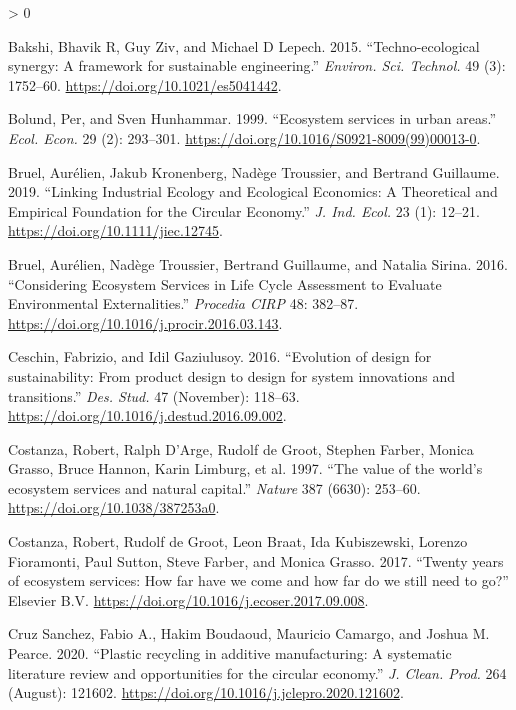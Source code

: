 \documentclass[
  14pt,
]{extarticle}
\newlength{\cslhangindent}
\newenvironment{CSLReferences}[2] %
 {%
  \setlength{\parindent}{0pt}
  \ifodd #1 \everypar{\setlength{\hangindent}{\cslhangindent}}\ignorespaces\fi
  \ifnum #2 > 0
  \setlength{\parskip}{#2\baselineskip}
  \fi
 }%
 {}
\begin{document}
\hypertarget{refs}{}
\begin{CSLReferences}{1}{0}
\leavevmode\hypertarget{ref-Bakshi2015}{}%
Bakshi, Bhavik R, Guy Ziv, and Michael D Lepech. 2015. {``{Techno-ecological synergy: A framework for sustainable engineering}.''} \emph{Environ. Sci. Technol.} 49 (3): 1752--60. \url{https://doi.org/10.1021/es5041442}.

\leavevmode\hypertarget{ref-Bolund1999}{}%
Bolund, Per, and Sven Hunhammar. 1999. {``{Ecosystem services in urban areas}.''} \emph{Ecol. Econ.} 29 (2): 293--301. \url{https://doi.org/10.1016/S0921-8009(99)00013-0}.

\leavevmode\hypertarget{ref-Bruel2018}{}%
Bruel, Aurélien, Jakub Kronenberg, Nadège Troussier, and Bertrand Guillaume. 2019. {``{Linking Industrial Ecology and Ecological Economics: A Theoretical and Empirical Foundation for the Circular Economy}.''} \emph{J. Ind. Ecol.} 23 (1): 12--21. \url{https://doi.org/10.1111/jiec.12745}.

\leavevmode\hypertarget{ref-Bruel2016}{}%
Bruel, Aurélien, Nadège Troussier, Bertrand Guillaume, and Natalia Sirina. 2016. {``{Considering Ecosystem Services in Life Cycle Assessment to Evaluate Environmental Externalities}.''} \emph{Procedia CIRP} 48: 382--87. \url{https://doi.org/10.1016/j.procir.2016.03.143}.

\leavevmode\hypertarget{ref-Ceschin2016}{}%
Ceschin, Fabrizio, and Idil Gaziulusoy. 2016. {``{Evolution of design for sustainability: From product design to design for system innovations and transitions}.''} \emph{Des. Stud.} 47 (November): 118--63. \url{https://doi.org/10.1016/j.destud.2016.09.002}.

\leavevmode\hypertarget{ref-Costanza1997}{}%
Costanza, Robert, Ralph D'Arge, Rudolf de Groot, Stephen Farber, Monica Grasso, Bruce Hannon, Karin Limburg, et al. 1997. {``{The value of the world's ecosystem services and natural capital}.''} \emph{Nature} 387 (6630): 253--60. \url{https://doi.org/10.1038/387253a0}.

\leavevmode\hypertarget{ref-Costanza2017}{}%
Costanza, Robert, Rudolf de Groot, Leon Braat, Ida Kubiszewski, Lorenzo Fioramonti, Paul Sutton, Steve Farber, and Monica Grasso. 2017. {``{Twenty years of ecosystem services: How far have we come and how far do we still need to go?}''} Elsevier B.V. \url{https://doi.org/10.1016/j.ecoser.2017.09.008}.

\leavevmode\hypertarget{ref-CruzSanchez2020}{}%
Cruz Sanchez, Fabio A., Hakim Boudaoud, Mauricio Camargo, and Joshua M. Pearce. 2020. {``{Plastic recycling in additive manufacturing: A systematic literature review and opportunities for the circular economy}.''} \emph{J. Clean. Prod.} 264 (August): 121602. \url{https://doi.org/10.1016/j.jclepro.2020.121602}.


\end{CSLReferences}
\end{document}

